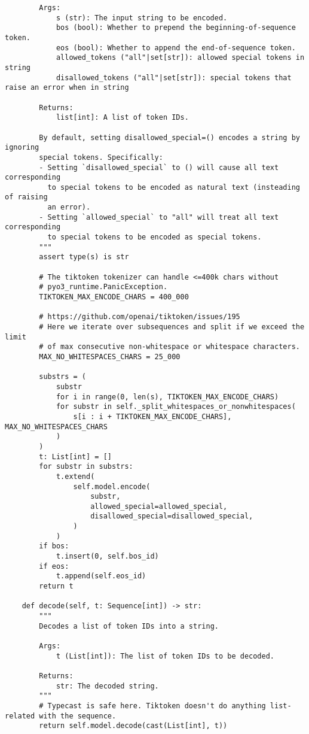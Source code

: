 \begin{lstlisting}
        Args:
            s (str): The input string to be encoded.
            bos (bool): Whether to prepend the beginning-of-sequence token.
            eos (bool): Whether to append the end-of-sequence token.
            allowed_tokens ("all"|set[str]): allowed special tokens in string
            disallowed_tokens ("all"|set[str]): special tokens that raise an error when in string

        Returns:
            list[int]: A list of token IDs.

        By default, setting disallowed_special=() encodes a string by ignoring
        special tokens. Specifically:
        - Setting `disallowed_special` to () will cause all text corresponding
          to special tokens to be encoded as natural text (insteading of raising
          an error).
        - Setting `allowed_special` to "all" will treat all text corresponding
          to special tokens to be encoded as special tokens.
        """
        assert type(s) is str

        # The tiktoken tokenizer can handle <=400k chars without
        # pyo3_runtime.PanicException.
        TIKTOKEN_MAX_ENCODE_CHARS = 400_000

        # https://github.com/openai/tiktoken/issues/195
        # Here we iterate over subsequences and split if we exceed the limit
        # of max consecutive non-whitespace or whitespace characters.
        MAX_NO_WHITESPACES_CHARS = 25_000

        substrs = (
            substr
            for i in range(0, len(s), TIKTOKEN_MAX_ENCODE_CHARS)
            for substr in self._split_whitespaces_or_nonwhitespaces(
                s[i : i + TIKTOKEN_MAX_ENCODE_CHARS], MAX_NO_WHITESPACES_CHARS
            )
        )
        t: List[int] = []
        for substr in substrs:
            t.extend(
                self.model.encode(
                    substr,
                    allowed_special=allowed_special,
                    disallowed_special=disallowed_special,
                )
            )
        if bos:
            t.insert(0, self.bos_id)
        if eos:
            t.append(self.eos_id)
        return t

    def decode(self, t: Sequence[int]) -> str:
        """
        Decodes a list of token IDs into a string.

        Args:
            t (List[int]): The list of token IDs to be decoded.

        Returns:
            str: The decoded string.
        """
        # Typecast is safe here. Tiktoken doesn't do anything list-related with the sequence.
        return self.model.decode(cast(List[int], t))


\end{lstlisting}
